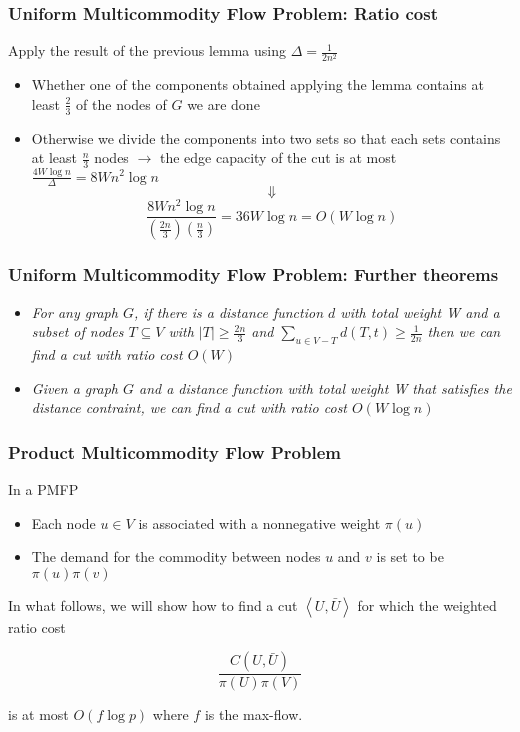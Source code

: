 \begin{frame}
\frametitle{Uniform Multicommodity Flow Problem: Ratio cost}

Apply the result of the previous lemma using $\Delta = \frac{1}{2n^2}$

\begin{itemize}
\item Whether one of the components obtained applying the lemma contains at least $\frac{2}{3}$ of the nodes of $G$ we are done
\item Otherwise we divide the components into two sets so that each sets contains at least $\frac{n}{3}$ nodes $\rightarrow$ the edge capacity of the cut is at most $\frac{4W\log n}{\Delta} = 8Wn^2 \log n$
$$\Downarrow$$
$$\frac{8Wn^2 \log n}{\left ( \frac{2n}{3} \right )\left ( \frac{n}{3} \right )} = 36W\log n = O(W \log n)$$
\end{itemize}
\end{frame}

\begin{frame}
\frametitle{Uniform Multicommodity Flow Problem: Further theorems}

\begin{itemize}
\item \emph{For any graph $G$, if there is a distance function $d$ with total weight W and a subset of nodes $T \subseteq V$ with $|T|\geq \frac{2n}{3}$ and $\sum_{u \in V-T}d(T,t) \geq \frac{1}{2n}$ then we can find a cut with ratio cost $O(W)$} 
\item \emph{Given a graph $G$ and a distance function with total weight W that satisfies the distance contraint, we can find a cut with ratio cost $O(W\log n)$}
\end{itemize}
\end{frame}

\begin{frame}
\frametitle{Product Multicommodity Flow Problem}

In a PMFP 
\begin{itemize}
\item Each node $u \in V$ is associated with a nonnegative weight $\pi (u)$
\item The demand for the commodity between nodes $u$ and $v$ is set to be $\pi (u) \pi (v)$
\end{itemize}

In what follows, we will show how to find a cut $\left \langle U, \bar{U} \right \rangle$ for which the weighted ratio cost

$$\frac{C(U,\bar{U})}{\pi (U)\pi (V)}$$

is at most $O(f\log p)$ where $f$ is the max-flow.
\end{frame}

